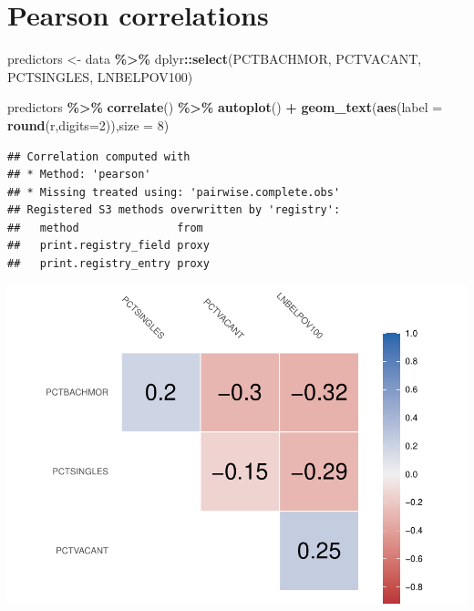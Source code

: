\documentclass[
]{article}
\newenvironment{Shaded}{\begin{snugshade}}{\end{snugshade}}
\newcommand{\AttributeTok}[1]{\textcolor[rgb]{0.13,0.29,0.53}{#1}}
\newcommand{\DecValTok}[1]{\textcolor[rgb]{0.00,0.00,0.81}{#1}}
\newcommand{\FunctionTok}[1]{\textcolor[rgb]{0.13,0.29,0.53}{\textbf{#1}}}
\newcommand{\NormalTok}[1]{#1}
\newcommand{\OtherTok}[1]{\textcolor[rgb]{0.56,0.35,0.01}{#1}}
\newcommand{\SpecialCharTok}[1]{\textcolor[rgb]{0.81,0.36,0.00}{\textbf{#1}}}
\begin{document}
\hypertarget{pearson-correlations}{%
\section{Pearson correlations}\label{pearson-correlations}}

\begin{Shaded}
\begin{Highlighting}[]
\NormalTok{predictors }\OtherTok{\textless{}{-}}\NormalTok{ data }\SpecialCharTok{\%\textgreater{}\%}\NormalTok{ dplyr}\SpecialCharTok{::}\FunctionTok{select}\NormalTok{(PCTBACHMOR, PCTVACANT, PCTSINGLES, LNBELPOV100)}

\NormalTok{predictors }\SpecialCharTok{\%\textgreater{}\%} 
  \FunctionTok{correlate}\NormalTok{() }\SpecialCharTok{\%\textgreater{}\%} 
  \FunctionTok{autoplot}\NormalTok{() }\SpecialCharTok{+}
  \FunctionTok{geom\_text}\NormalTok{(}\FunctionTok{aes}\NormalTok{(}\AttributeTok{label =} \FunctionTok{round}\NormalTok{(r,}\AttributeTok{digits=}\DecValTok{2}\NormalTok{)),}\AttributeTok{size =} \DecValTok{8}\NormalTok{)}
\end{Highlighting}
\end{Shaded}

\begin{verbatim}
## Correlation computed with
## * Method: 'pearson'
## * Missing treated using: 'pairwise.complete.obs'
## Registered S3 methods overwritten by 'registry':
##   method               from 
##   print.registry_field proxy
##   print.registry_entry proxy
\end{verbatim}

\includegraphics{HW1-Regression_files/figure-latex/pearson-1.pdf}
\end{document}
